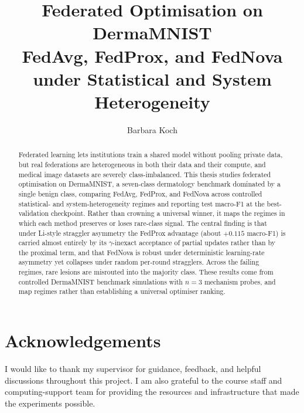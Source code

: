\documentclass[11pt,a4paper]{report}
\title{Federated Optimisation on DermaMNIST\\
\large FedAvg, FedProx, and FedNova under Statistical and System Heterogeneity}
\author{Barbara Koch}
\date{}
\begin{document}

\maketitle

\begin{abstract}
Federated learning lets institutions train a shared model without pooling private
data, but real federations are heterogeneous in both their data and their compute,
and medical image datasets are severely class-imbalanced. This thesis studies
federated optimisation on DermaMNIST, a seven-class dermatology benchmark
dominated by a single benign class, comparing FedAvg, FedProx, and FedNova across
controlled statistical- and system-heterogeneity regimes and reporting test
macro-F1 at the best-validation checkpoint. Rather than crowning a universal
winner, it maps the regimes in which each method preserves or loses rare-class
signal. The central finding is that under Li-style straggler asymmetry the FedProx
advantage (about $+0.115$ macro-F1) is carried almost entirely by its
$\gamma$-inexact acceptance of partial updates rather than by the proximal term,
and that FedNova is robust under deterministic learning-rate asymmetry yet
collapses under random per-round stragglers. Across the failing regimes, rare
lesions are misrouted into the majority class. These results come from controlled
DermaMNIST benchmark simulations with $n=3$ mechanism probes, and map regimes
rather than establishing a universal optimiser ranking.
\end{abstract}

\chapter*{Acknowledgements}
I would like to thank my supervisor for guidance, feedback, and helpful
discussions throughout this project. I am also grateful to the course staff and
computing-support team for providing the resources and infrastructure that made
the experiments possible.

\tableofcontents
\listoffigures
\listoftables


\end{document}
